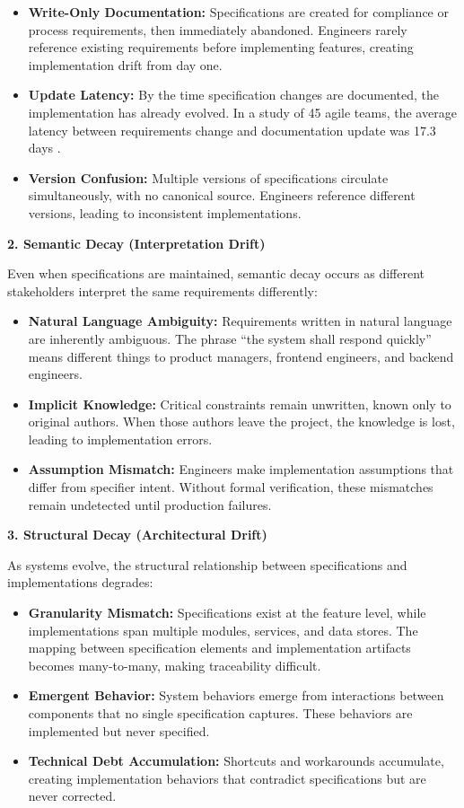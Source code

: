 \begin{itemize}
    \item \textbf{Write-Only Documentation:} Specifications are created for compliance or process requirements, then immediately abandoned. Engineers rarely reference existing requirements before implementing features, creating implementation drift from day one.
    \item \textbf{Update Latency:} By the time specification changes are documented, the implementation has already evolved. In a study of 45 agile teams, the average latency between requirements change and documentation update was 17.3 days \cite{ambler2018agile}.
    \item \textbf{Version Confusion:} Multiple versions of specifications circulate simultaneously, with no canonical source. Engineers reference different versions, leading to inconsistent implementations.
\end{itemize}

\textbf{2. Semantic Decay (Interpretation Drift)}

Even when specifications are maintained, semantic decay occurs as different stakeholders interpret the same requirements differently:

\begin{itemize}
    \item \textbf{Natural Language Ambiguity:} Requirements written in natural language are inherently ambiguous. The phrase ``the system shall respond quickly'' means different things to product managers, frontend engineers, and backend engineers.
    \item \textbf{Implicit Knowledge:} Critical constraints remain unwritten, known only to original authors. When those authors leave the project, the knowledge is lost, leading to implementation errors.
    \item \textbf{Assumption Mismatch:} Engineers make implementation assumptions that differ from specifier intent. Without formal verification, these mismatches remain undetected until production failures.
\end{itemize}

\textbf{3. Structural Decay (Architectural Drift)}

As systems evolve, the structural relationship between specifications and implementations degrades:

\begin{itemize}
    \item \textbf{Granularity Mismatch:} Specifications exist at the feature level, while implementations span multiple modules, services, and data stores. The mapping between specification elements and implementation artifacts becomes many-to-many, making traceability difficult.
    \item \textbf{Emergent Behavior:} System behaviors emerge from interactions between components that no single specification captures. These behaviors are implemented but never specified.
    \item \textbf{Technical Debt Accumulation:} Shortcuts and workarounds accumulate, creating implementation behaviors that contradict specifications but are never corrected.
\end{itemize}

